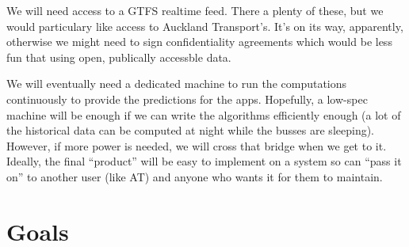 \documentclass[12pt,a4paper]{article}
\begin{document}











We will need access to a GTFS realtime feed.
There a plenty of these, but we would particulary like access to Auckland Transport's.
It's on its way, apparently, otherwise we might need to sign confidentiality agreements which would be less 
fun that using open, publically accessble data.


We will eventually need a dedicated machine to run the computations continuously to provide the predictions
for the apps.
Hopefully, a low-spec machine will be enough if we can write the algorithms efficiently enough 
(a lot of the historical data can be computed at night while the busses are sleeping).
However, if more power is needed, we will cross that bridge when we get to it.
Ideally, the final ``product'' will be easy to implement on a system so can ``pass it on''
to another user (like AT) and anyone who wants it for them to maintain.





\section{Goals}

\end{document}
